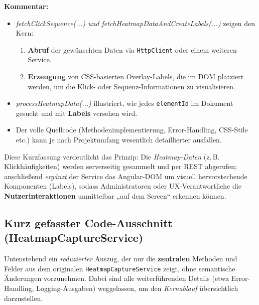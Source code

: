 \documentclass[12pt,oneside]{article}
\begin{document}
\noindent
\textbf{Kommentar:}
\begin{itemize}
  \item \emph{fetchClickSequence(...) und fetchHeatmapDataAndCreateLabels(...)} zeigen den Kern: 
  \begin{enumerate}
    \item \textbf{Abruf} der gewünschten Daten via \lstinline|HttpClient| oder einem weiteren Service.
    \item \textbf{Erzeugung} von CSS-basierten Overlay-Labels, die im DOM platziert werden, um die Klick- oder Sequenz-Informationen zu visualisieren.
  \end{enumerate}
  \item \emph{processHeatmapData(...)} illustriert, wie jedes \lstinline|elementId| im Dokument gesucht und mit \textbf{Labels} versehen wird.
  \item Der volle Quellcode (Methodenimplementierung, Error-Handling, CSS-Stile etc.) kann je nach Projektumfang wesentlich detaillierter ausfallen.
\end{itemize}

Diese Kurzfassung verdeutlicht das Prinzip: Die \emph{Heatmap-Daten} (z.\,B. Klickhäufigkeiten) werden serverseitig gesammelt und per REST abgerufen; anschließend \emph{ergänzt} der Service das Angular-DOM um visuell hervorstechende Komponenten (Labels), sodass Administratoren oder UX-Verantwortliche die \textbf{Nutzerinteraktionen} unmittelbar „auf dem Screen“ erkennen können.

\subsection{Kurz gefasster Code-Ausschnitt (HeatmapCaptureService)}
\label{subsec:heatmap_capture_service_summary}

Untenstehend ein \emph{reduzierter} Auszug, der nur die \textbf{zentralen} Methoden und Felder aus dem originalen \lstinline|HeatmapCaptureService| zeigt, ohne semantische Änderungen vorzunehmen. Dabei sind alle weiterführenden Details (etwa Error-Handling, Logging-Ausgaben) weggelassen, um den \emph{Kernablauf} übersichtlich darzustellen.
\end{document}
